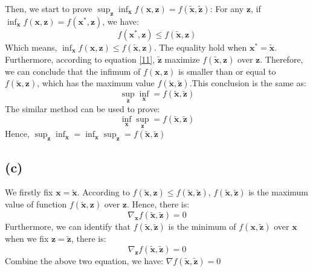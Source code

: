 \documentclass[10pt,a4paper]{article}
\begin{document}
Then, we start to prove $\displaystyle\sup_{\mathbf{z}} \displaystyle\inf_{\mathbf{x}}f(\mathbf{x}, \mathbf{z}) = f(\tilde{\mathbf{x}}, \tilde{\mathbf{z}})$: For any $\mathbf{z}$, if $\displaystyle\inf_{\mathbf{x}}f(\mathbf{x}, \mathbf{z}) = f(\mathbf{x}^{*}, \mathbf{z})$, we have:
\begin{equation*}
	f(\mathbf{x}^{*}, \mathbf{z}) \leq f(\tilde{\mathbf{x}}, \mathbf{z})
\end{equation*}
Which means, $\displaystyle\inf_{\mathbf{x}}f(\mathbf{x}, \mathbf{z}) \leq f(\tilde{\mathbf{x}}, \mathbf{z})$. The equality hold when $\mathbf{x}^{*} = \tilde{\mathbf{x}}$. Furthermore, according to equation \ref{11}, $\tilde{\mathbf{z}}$ maximize $f(\tilde{\mathbf{x}}, \mathbf{z})$ over $\mathbf{z}$. Therefore, we can conclude that the infimum of $f(\mathbf{x}, \mathbf{z})$ is smaller than or equal to $f(\tilde{\mathbf{x}}, \mathbf{z})$, which has the maximum value $f(\tilde{\mathbf{x}}, \tilde{\mathbf{z}})$.This conclusion is the same as:
\begin{equation*}
	\displaystyle\sup_{\mathbf{z}}\inf_{\mathbf{x}} = f(\tilde{\mathbf{x}}, \tilde{\mathbf{z}})
\end{equation*}
The similar method can be used to prove:
\begin{equation*}
	\displaystyle\inf_{\mathbf{x}}\sup_{\mathbf{z}} = f(\tilde{\mathbf{x}}, \tilde{\mathbf{z}})
\end{equation*}
Hence, $\displaystyle\sup_{\mathbf{z}}\inf_{\mathbf{x}} = \displaystyle\inf_{\mathbf{x}}\sup_{\mathbf{z}} = f(\tilde{\mathbf{x}}, \tilde{\mathbf{z}})$

\subsection*{(c)}
We firstly fix $\mathbf{x} = \tilde{\mathbf{x}}$. According to $f(\tilde{\mathbf{x}}, \mathbf{z}) \leq f(\tilde{\mathbf{x}}, \tilde{\mathbf{z}})$, $f(\tilde{\mathbf{x}}, \tilde{\mathbf{z}})$ is the maximum value of function $f(\tilde{\mathbf{x}}, \mathbf{z})$ over $\mathbf{z}$. Hence, there is:
\begin{equation*}
	\nabla_{\mathbf{x}} f(\tilde{\mathbf{x}}, \tilde{\mathbf{z}}) = 0
\end{equation*}
Furthermore, we can identify that $f(\tilde{\mathbf{x}}, \tilde{\mathbf{z}})$ is the minimum of $f(\mathbf{x}, \tilde{\mathbf{z}})$ over $\mathbf{x}$ when we fix $\mathbf{z} = \tilde{\mathbf{z}}$, there is:
\begin{equation*}
	\nabla_{\mathbf{z}} f(\tilde{\mathbf{x}}, \tilde{\mathbf{z}}) = 0
\end{equation*}
Combine the above two equation, we have: $\nabla f(\tilde{\mathbf{x}}, \tilde{\mathbf{z}}) = 0$
\end{document}
